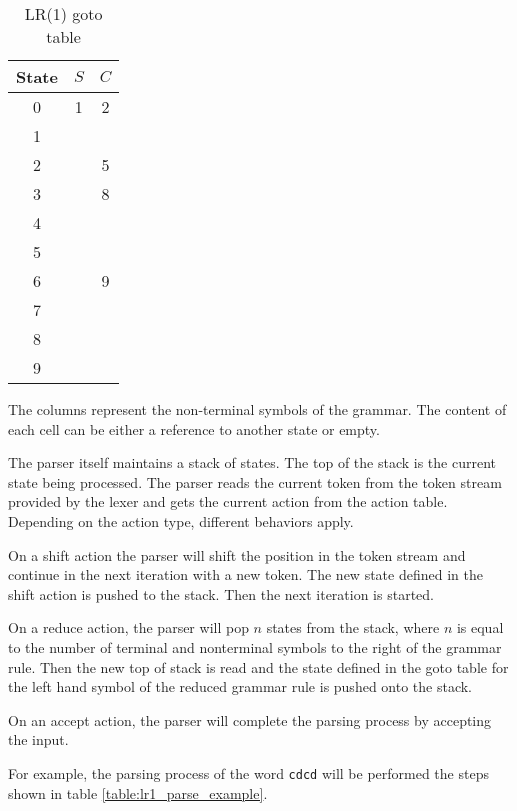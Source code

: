 \begin{table}
\centering
\begin{tabular}{c|cc}
State & $S$ & $C$\\
\hline 
0 & 1 & 2\\
1 &    &     \\
2 &  & 5 \\
3 &  & 8  \\
4 &  &   \\
5 &  & \\
6 &  & 9 \\
7 &  & \\
8 &  &  \\
9 &  & 
\end{tabular} 
\caption{LR(1) goto table}
\end{table}

The columns represent the non-terminal symbols of the grammar. 
The content of each cell can be either a reference to another state or empty.

The parser itself maintains a stack of states. 
The top of the stack is the current state being processed. 
The parser reads the current token from the token stream provided by the lexer and gets the current action from the action table.
Depending on the action type, different behaviors apply.

On a shift action the parser will shift the position in the token stream and continue in the next iteration with a new token. 
The new state defined in the shift action is pushed to the stack. Then the next iteration is started.

On a reduce action, the parser will pop $n$ states from the stack, where $n$ is equal to the number of terminal and nonterminal 
symbols to the right of the grammar rule. Then the new top of stack is read and the state defined in the goto 
table for the left hand symbol of the reduced grammar rule is pushed onto the stack.

On an accept action, the parser will complete the parsing process by accepting the input. 

For example, the parsing process of the word \verb|cdcd| will be performed the steps shown in table \ref{table:lr1_parse_example}.

